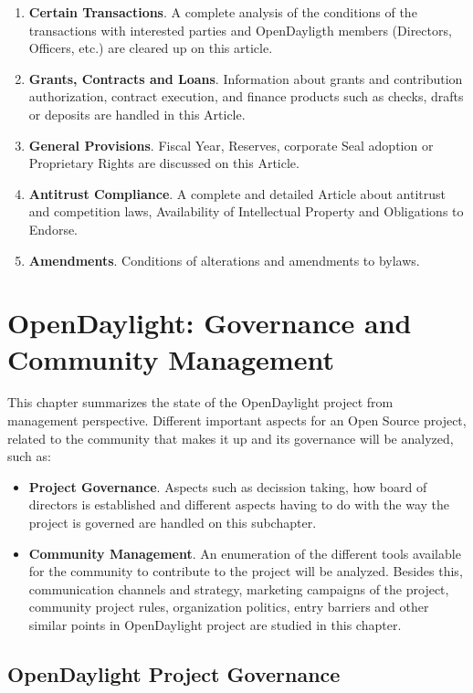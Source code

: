 \documentclass[a4paper, 12pt]{book}
\begin{document}
\begin{enumerate}
 \item{\textbf{Certain Transactions}}. A complete analysis of the conditions of the transactions with interested parties and OpenDayligth members (Directors, Officers, etc.) are cleared up on this article.
 \item{\textbf{Grants, Contracts and Loans}}. Information about grants and contribution authorization, contract execution, and finance products such as checks, drafts or deposits are handled in this Article.
 \item{\textbf{General Provisions}}. Fiscal Year, Reserves, corporate Seal adoption or Proprietary Rights are discussed on this Article.
 \item{\textbf{Antitrust Compliance}}. A complete and detailed Article about antitrust and competition laws, Availability of Intellectual Property and Obligations to Endorse.
 \item{\textbf{Amendments}}. Conditions of alterations and amendments to bylaws.
\end{enumerate}

\chapter{OpenDaylight: Governance and Community Management}
\label{chap:odlcommunity}

This chapter summarizes the state of the OpenDaylight project from management perspective. Different important aspects for an Open Source project, related to the community that makes it up and its governance will be analyzed, such as:
\begin{itemize}\itemsep0pt
\item{\textbf{Project Governance}}. Aspects such as decission taking, how board of directors is established and different aspects having to do with the way the project is governed are handled on this subchapter.
\item{\textbf{Community Management}}. An enumeration of the different tools available for the community to contribute to the project will be analyzed. Besides this, communication channels and strategy, marketing campaigns of the project, community project rules, organization politics, entry barriers and other similar points in OpenDaylight project are studied in this chapter.
\end{itemize}

\section{OpenDaylight Project Governance}
\label{sec:odlgovernance}
\end{document}
